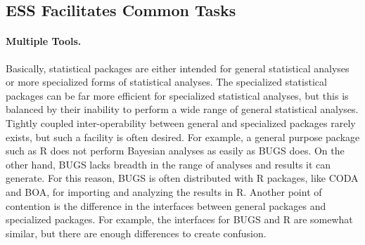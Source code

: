 \documentclass{article}
\begin{document}
\subsection{ESS Facilitates Common Tasks}
\label{sec:ess-facil-comm}

\paragraph{Multiple Tools.}
\label{sec:multiple-tools}

Basically, statistical packages are either intended for general
statistical analyses or more specialized forms of statistical analyses.
The specialized statistical packages can be far more efficient for
specialized statistical analyses, but this is balanced by their inability
to perform a wide range of general statistical analyses.  Tightly coupled
inter-operability between general and specialized packages rarely exists,
but such a facility is often desired.  For example, a general purpose
package such as R does not perform Bayesian analyses as easily as BUGS does.
On the other hand, BUGS lacks breadth in the range of analyses and results
it can generate.  For this reason, BUGS is often distributed with R packages,
like CODA and BOA, for importing and analyzing the results in R.  Another
point of contention is the difference in the interfaces between general
packages and specialized packages.  For example, the interfaces for BUGS
and R are somewhat similar, but there are enough differences to create confusion.
\end{document}
